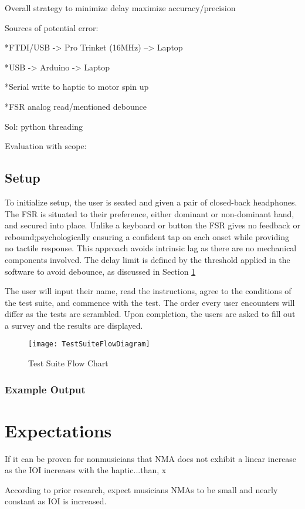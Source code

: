 Overall strategy to minimize delay maximize accuracy/precision

Sources of potential error:

    *FTDI/USB -> Pro Trinket (16MHz) --> Laptop

    *USB -> Arduino -> Laptop

    *Serial write to haptic to motor spin up

    *FSR analog read/mentioned debounce

    Sol: python threading

    Evaluation with scope:

\subsection{Setup} \label{testSetup}

To initialize setup, the user is seated and given a pair of closed-back headphones. The FSR is situated to their preference, either dominant or non-dominant hand, and secured into place. Unlike a keyboard or button the FSR gives no feedback or rebound;psychologically ensuring a confident tap on each onset while providing no tactile response. This approach avoids intrinsic lag as there are no mechanical components involved. The delay limit is defined by the threshold applied in the software to avoid debounce, as discussed in Section \ref{}

The user will input their name, read the instructions, agree to the conditions of the test suite, and commence with the test. The order every user encounters will differ as the tests are scrambled. Upon completion, the users are asked to fill out a survey and the results are displayed.

\begin{figure}[H]
    \centering
    \texttt{[image: TestSuiteFlowDiagram]}
    \caption{Test Suite Flow Chart}
    \label{fig:TestSuiteFlowDiagram}
\end{figure}

\subsubsection{Example Output}
    
\section{Expectations}

If it can be proven for nonmusicians that NMA does not exhibit a linear increase as the IOI increases with the haptic...than, x

According to prior research, expect musicians NMAs to be small and nearly constant as IOI is increased.\cite{repp2013sensorimotor,4}



